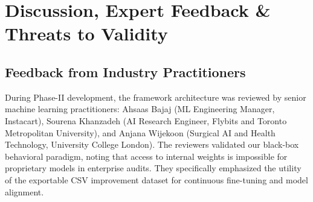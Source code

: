 \documentclass[conference]{IEEEtran}
\begin{document}
\begin{table}[h]
\caption{\textbf{Capability Comparison with Existing Evaluation Approaches.}}
\label{tab:comparison}
\centering
\renewcommand{\arraystretch}{1.15}
\end{table}

\section{Discussion, Expert Feedback \& Threats to Validity}
\label{sec:discussion}

\subsection{Feedback from Industry Practitioners}
During Phase-II development, the framework architecture was reviewed by senior machine learning practitioners: Ahsaas Bajaj (ML Engineering Manager, Instacart), Sourena Khanzadeh (AI Research Engineer, Flybits and Toronto Metropolitan University), and Anjana Wijekoon (Surgical AI and Health Technology, University College London). The reviewers validated our black-box behavioral paradigm, noting that access to internal weights is impossible for proprietary models in enterprise audits. They specifically emphasized the utility of the exportable CSV improvement dataset for continuous fine-tuning and model alignment.
\end{document}
